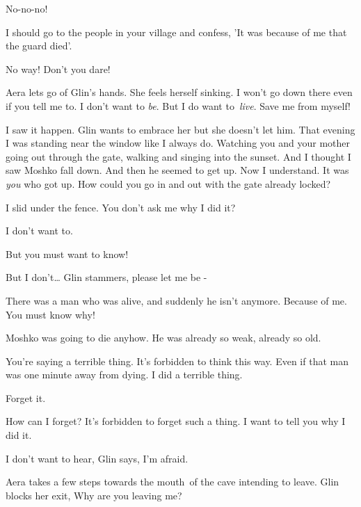 \documentclass[twoside,11pt]{book}
\begin{document}
{\textquotedbl}No-no-no!{\textquotedbl}~ 

{\textquotedbl}I should go to the people in your village and confess, 'It was because of me that the guard
died'.{\textquotedbl} 

{\textquotedbl}No way! Don't you dare!{\textquotedbl} ~~~~~~~~~~~~~~~~~~~~~~~~~~~~~~~~~~~~~~~~~~~~ 

Aera lets go of Glin's hands. She feels herself sinking. {\textquotedbl}I won't go down there even if you tell me to. I
don't want to \textit{be}. But I do want to\ \textit{live}. Save me from myself!{\textquotedbl} 

{\textquotedbl}I saw it happen.{\textquotedbl} Glin wants to embrace her but she doesn't let him. {\textquotedbl}That
evening I was standing near the window like I always do. Watching you and your mother going out through the gate,
walking and singing into the sunset. And I thought I saw Moshko fall down. And then he seemed to get up. Now I
understand. It was \textit{you} who got up. How could you go in and out with the gate already locked?{\textquotedbl} 

{\textquotedbl}I slid under the fence. You don't ask me why I did it?{\textquotedbl} 

{\textquotedbl}I don't want to.{\textquotedbl} 

{\textquotedbl}But you must want to know!{\textquotedbl} 

{\textquotedbl}But I don't{\dots}{\textquotedbl} Glin stammers, {\textquotedbl}please let me be -{\textquotedbl} 

{\textquotedbl}There was a man who was alive, and suddenly he isn't anymore. Because of me. You must know
why!{\textquotedbl} 

{\textquotedbl}Moshko was going to die anyhow. He was already so weak, already so old.{\textquotedbl} 

{\textquotedbl}You're saying a terrible thing. It's forbidden to think this way. Even if that man was one minute away
from dying. I did a terrible thing.{\textquotedbl} 

{\textquotedbl}Forget it.{\textquotedbl} 

{\textquotedbl}How can I forget? It's forbidden to forget such a thing. I want to tell you why I did it.{\textquotedbl} 

{\textquotedbl}I don't want to hear,{\textquotedbl} Glin says, {\textquotedbl}I'm afraid.{\textquotedbl}\ 

Aera takes a few steps towards the mouth{\ }of the cave intending to leave. Glin blocks her exit,
{\textquotedbl}Why are you leaving me?{\textquotedbl} 
\end{document}
